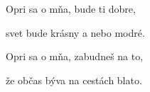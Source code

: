 \begin{song}
\bigskip


\bigskip

 Opri sa o mňa,  bude ti dobre, \par
{} svet bude krásny  a nebo modré. \par

\bigskip

 Opri sa o mňa,  zabudneš na to, \par
{} že občas býva na cestách blato. \par

\end{song}

